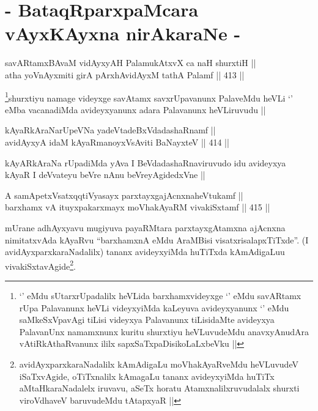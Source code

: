 \section*{- BataqRparxpaMcara vAyxKAyxna nirAkaraNe -}

\begin{shl}
savARtamxBAvaM vidAyxyAH PalamukAtxvX ca naH shurxtiH || \\
atha yoV\s nAyxmiti girA pArxhAvidAyxM tathA Palamf ||  413 ||  
\end{shl}

\begin{artha}
\footnote{`\stext' eMdu sUtarxrUpadalilx heVLida barxhamxvideyxge
  `\stext' eMdu savARtamx rUpa Palavanunx heVLi videyxyiMda kaLeyuva
  avideyxyanunx `\stext' eMdu saMkeSxVpavAgi tiLisi videyxya
  Palavanunx tiLisidaMte avideyxya PalavanUnx namamxnunx kuritu
  shurxtiyu heVLuvudeMdu anavxyAnudAra vAtiRkAthaRvanunx ililx
  sapxSaTxpaDisikoLaLxbeVku ||}shurxtiyu namage videyxge savAtamx savxrUpavanunx PalaveMdu
heVLi `\stext' eMba vacanadiMda avideyxyanunx adara Palavanunx
heVLiruvudu ||
\end{artha}


\begin{shl}
kAyaRkAraNarUpeVNa yadeVtadeBxVdadashaRnamf || \\
avidAyxyA idaM kAyaRmanoyxV\s sAviti BaNayxteV ||  414 ||  
\end{shl}

\begin{artha}
kAyARkAraNa rUpadiMda yAva I BeVdadashaRnaviruvudo idu avideyxya kAyaR
I deVvateyu beVre nAnu beVreyAgidedxVne ||
\end{artha}


\begin{shl}
A samApetxVsatxqqtiVyasayx parxtayxgajAcnxnaheVtukamf || \\
barxhamx vA ituyxpakarxmayx moVhakAyaRM vivakiSxtamf ||  415 ||  
\end{shl}

\begin{artha}
mUrane adhAyxyavu mugiyuva payaRMtara parxtayxgAtamxna ajAcnxna
nimitatxvAda kAyaRvu ``barxhamxnA eMdu AraMBisi
visatxrisalapxTiTxde''. (I avidAyxparxkaraNadalilx) tananx
avideyxyiMda huTiTxda kAmAdigaLuu
vivakiSxtavAgide\footnote{avidAyxparxkaraNadalilx kAmAdigaLu
  moVhakAyaRveMdu heVLuvudeV iSaTxvAgide, oTiTxnalilx kAmagaLu tananx
  avideyxyiMda huTiTx aMtaHkaraNadalelx iruvavu, aSeTx horatu
  Atamxnalilxruvudalalx shurxti viroVdhaveV baruvudeMdu tAtapxyaR ||}. 
\end{artha}

